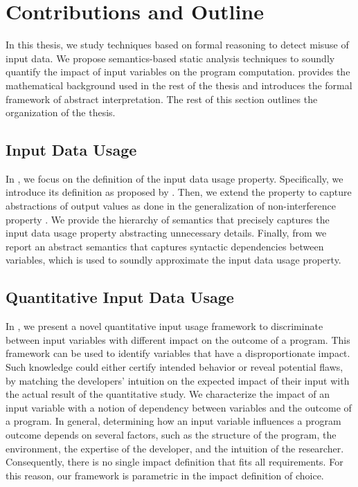 \section{Contributions and Outline}

In this thesis, we study techniques based on formal reasoning to detect misuse of input data.
We propose semantics-based static analysis techniques to soundly quantify the impact of input variables on the program computation.
 provides the mathematical background used in the rest of the thesis and introduces the formal framework of abstract interpretation.
The rest of this section outlines the organization of the thesis.

\subsection{Input Data Usage}

In , we focus on the definition of the input data usage property. Specifically, we introduce its definition as proposed by .
Then, we extend the property to capture abstractions of output values as done in the generalization of non-interference property .
We provide the hierarchy of semantics that precisely captures the input data usage property abstracting unnecessary details.
Finally, from \textcite{Urban2018} we report an abstract semantics that captures syntactic dependencies between variables, which is used to soundly approximate the input data usage property.

\subsection{Quantitative Input Data Usage}

In , we present a novel quantitative input usage framework to discriminate between input variables with different impact on the outcome of a program.
This framework can be used to identify variables that have a disproportionate impact.
Such knowledge could either certify intended behavior or reveal potential flaws, by matching the developers' intuition on the expected impact of their input with the actual result of the quantitative study.
We characterize the impact of an input variable with a notion of dependency between variables and the outcome of a program.
In general, determining how an input variable influences a program outcome depends on several factors, such as the structure of the program, the environment, the expertise of the developer, and the intuition of the researcher.
Consequently, there is no single impact definition that fits all requirements. For this reason, our framework is parametric in the impact definition of choice.

